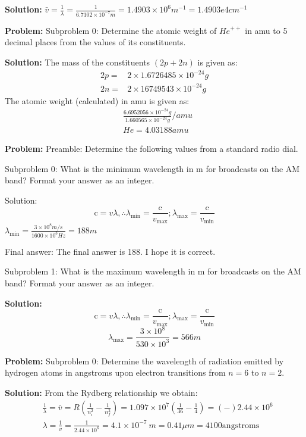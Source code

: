 \documentclass[10pt]{article}
\begin{document}
\textbf{Solution:}
$\bar{v}=\frac{1}{\lambda}=\frac{1}{6.7102 \times 10^{-7} m}=1.4903 \times 10^{6} m^{-1}= \boxed{1.4903e4} {cm}^{-1}$


\textbf{Problem:}
Subproblem 0: Determine the atomic weight of ${He}^{++}$ in amu to 5 decimal places from the values of its constituents.


\textbf{Solution:}
The mass of the constituents $(2 p+2 n)$ is given as:
\[
\begin{array}{ll}
2 p= & 2 \times 1.6726485 \times 10^{-24} g \\
2 n= & 2 \times 16749543 \times 10^{-24} g
\end{array}
\]
The atomic weight (calculated) in amu is given as:
\[
\begin{aligned}
&\frac{6.6952056 \times 10^{-24} g}{1.660565 \times 10^{-24} g} / amu \\
&{He}=\boxed{4.03188} amu
\end{aligned}
\]


\textbf{Problem:}
Preamble: Determine the following values from a standard radio dial. 

Subproblem 0: What is the minimum wavelength in m for broadcasts on the AM band? Format your answer as an integer. 


Solution: \[
\mathrm{c}=v \lambda, \therefore \lambda_{\min }=\frac{\mathrm{c}}{v_{\max }} ; \lambda_{\max }=\frac{\mathrm{c}}{v_{\min }}
\]
$\lambda_{\min }=\frac{3 \times 10^{8} m / s}{1600 \times 10^{3} Hz}=\boxed{188} m$

Final answer: The final answer is 188. I hope it is correct.

Subproblem 1: What is the maximum wavelength in m for broadcasts on the AM band? Format your answer as an integer. 


\textbf{Solution:}
\[
\mathrm{c}=v \lambda, \therefore \lambda_{\min }=\frac{\mathrm{c}}{v_{\max }} ; \lambda_{\max }=\frac{\mathrm{c}}{v_{\min }}
\]
\[
\lambda_{\max }=\frac{3 \times 10^{8}}{530 \times 10^{3}}=\boxed{566} m
\]


\textbf{Problem:}
Subproblem 0: Determine the wavelength of radiation emitted by hydrogen atoms in angstroms upon electron transitions from $n=6$ to $n=2$.


\textbf{Solution:}
From the Rydberg relationship we obtain:
\[
\begin{aligned}
&\frac{1}{\lambda}=\bar{v}=R\left(\frac{1}{n_{i}^{2}}-\frac{1}{n_{f}^{2}}\right)=1.097 \times 10^{7}\left(\frac{1}{36}-\frac{1}{4}\right)=(-) 2.44 \times 10^{6} \\
&\lambda=\frac{1}{v}=\frac{1}{2.44 \times 10^{6}}=4.1 \times 10^{-7} {~m}=0.41 \mu {m}=\boxed{4100} \text{angstroms}
\end{aligned}
\]
\end{document}
